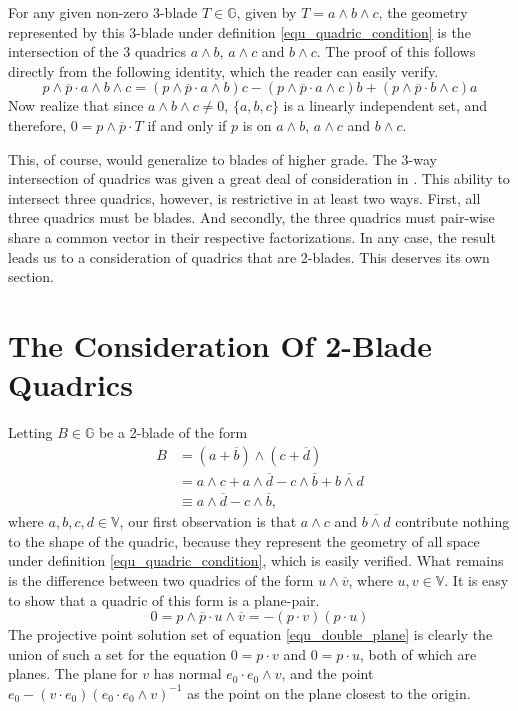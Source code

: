 \documentclass{birkjour}
\theoremstyle{definition}
\theoremstyle{remark}
\numberwithin{equation}{section}
\newcommand{\G}{\mathbb{G}}
\newcommand{\V}{\mathbb{V}}
\begin{document}
For any given non-zero 3-blade $T\in\G$, given by $T=a\wedge b\wedge c$, the
geometry represented by this 3-blade under definition \eqref{equ_quadric_condition} is the intersection
of the 3 quadrics $a\wedge b$, $a\wedge c$ and $b\wedge c$.
The proof of this follows directly from the following identity, which the reader can easily verify.
\begin{equation}
p\wedge\overline{p}\cdot a\wedge b\wedge c
 = (p\wedge\overline{p}\cdot a\wedge b)c
 - (p\wedge\overline{p}\cdot a\wedge c)b
 + (p\wedge\overline{p}\cdot b\wedge c)a
\end{equation}
Now realize that since $a\wedge b\wedge c\neq 0$, $\{a,b,c\}$ is a linearly
independent set, and therefore, $0=p\wedge\overline{p}\cdot T$ if and
only if $p$ is on $a\wedge b$, $a\wedge c$ and $b\wedge c$.

This, of course, would generalize to blades of higher grade.  The 3-way intersection
of quadrics was given a great deal of consideration in \cite{ZhiqiangXu05}.
This ability to intersect three quadrics, however, is restrictive in at least
two ways.  First, all three quadrics must be blades.   And secondly, the
three quadrics must pair-wise share a common vector in their respective factorizations.
In any case, the result leads us to a consideration
of quadrics that are 2-blades.  This deserves its own section.

\section{The Consideration Of 2-Blade Quadrics}

Letting $B\in\G$ be a 2-blade of the form
\begin{align}\label{equ_two_blade_quadric}
B &= (a+\overline{b})\wedge(c+\overline{d}) \\
 &= a\wedge c + a\wedge\overline{d} - c\wedge\overline{b} + \overline{b\wedge d} \\
 &\equiv a\wedge\overline{d} - c\wedge\overline{b},
\end{align}
where $a,b,c,d\in\V$, our first observation is that $a\wedge c$ and $\overline{b\wedge d}$ contribute nothing
to the shape of the quadric, because they represent the geometry of all space under
definition \eqref{equ_quadric_condition}, which is easily verified.  What remains is the difference
between two quadrics of the form $u\wedge\overline{v}$, where $u,v\in\V$.  It is
easy to show that a quadric of this form is a plane-pair.
\begin{equation}\label{equ_double_plane}
0 = p\wedge\overline{p}\cdot u\wedge\overline{v} = -(p\cdot v)(p\cdot u)
\end{equation}
The projective point solution set of equation \eqref{equ_double_plane} is
clearly the union of such a set for the equation $0=p\cdot v$ and $0=p\cdot u$,
both of which are planes.  The plane for $v$ has normal $e_0\cdot e_0\wedge v$,
and the point $e_0-(v\cdot e_0)(e_0\cdot e_0\wedge v)^{-1}$ as the point on the plane closest to the origin.
\end{document}
